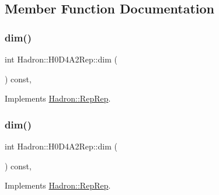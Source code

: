 \subsection{Member Function Documentation}
\mbox{\label{structHadron_1_1H0D4A2Rep_ab746308c018d06bc8d3e1822f84c9049}} 
\subsubsection{\texorpdfstring{dim()}{dim()}\hspace{0.1cm}{\footnotesize\ttfamily [1/5]}}
{\footnotesize\ttfamily int Hadron\+::\+H0\+D4\+A2\+Rep\+::dim (\begin{DoxyParamCaption}{ }\end{DoxyParamCaption}) const\hspace{0.3cm}{\ttfamily [inline]}, {\ttfamily [virtual]}}



Implements \mbox{\hyperlink{structHadron_1_1RepRep_a92c8802e5ed7afd7da43ccfd5b7cd92b}{Hadron\+::\+Rep\+Rep}}.

\mbox{\label{structHadron_1_1H0D4A2Rep_ab746308c018d06bc8d3e1822f84c9049}} 
\subsubsection{\texorpdfstring{dim()}{dim()}\hspace{0.1cm}{\footnotesize\ttfamily [2/5]}}
{\footnotesize\ttfamily int Hadron\+::\+H0\+D4\+A2\+Rep\+::dim (\begin{DoxyParamCaption}{ }\end{DoxyParamCaption}) const\hspace{0.3cm}{\ttfamily [inline]}, {\ttfamily [virtual]}}



Implements \mbox{\hyperlink{structHadron_1_1RepRep_a92c8802e5ed7afd7da43ccfd5b7cd92b}{Hadron\+::\+Rep\+Rep}}.

\mbox{\label{structHadron_1_1H0D4A2Rep_ab746308c018d06bc8d3e1822f84c9049}} 
